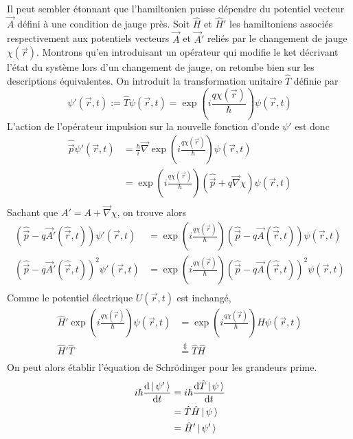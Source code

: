         Il peut sembler étonnant que l’hamiltonien puisse dépendre du potentiel vecteur $\vec{A}$ défini à une condition de jauge près. Soit $\hat{H}$ et $\hat{H}'$ les hamiltoniens associés respectivement aux potentiels vecteurs $\vec{A}$ et $\vec{A}'$ reliés par le changement de jauge $\chi(\vec{r})$. Montrons qu’en introduisant un opérateur qui modifie le ket décrivant l’état du système lors d’un changement de jauge, on retombe bien sur les descriptions équivalentes. On introduit la transformation unitaire $\hat{T}$ définie par 
        \[ \psi'(\vec{r},t) := \hat{T} \psi(\vec{r},t) = \exp\left(i \frac{q \chi(\vec{r})}{\hbar}\right) \psi(\vec{r},t) \]   
        L’action de l’opérateur impulsion sur la nouvelle fonction d’onde $\psi'$ est donc 
        \begin{align*}
            \hat{\vec{p}} \psi'(\vec{r},t) 
            &= \frac{\hbar}{i} \vec{\nabla} \exp\left(i \frac{q \chi(\vec{r})}{\hbar}\right) \psi(\vec{r},t) \\
            &= \exp\left(i \frac{q \chi(\vec{r})}{\hbar}\right) \left(\hat{\vec{p}} + q \vec{\nabla} \chi\right) \psi(\vec{r},t) \\
        \end{align*}
        Sachant que $A' = A + \vec{\nabla} \chi$, on trouve alors
        \begin{align*}
            \left(\hat{\vec{p}} - q \vec{A}'(\hat{\vec{r}},t)\right) \psi'(\vec{r},t) 
            &= \exp\left(i \frac{q \chi(\vec{r})}{\hbar}\right) \left(\hat{\vec{p}} - q \vec{A}(\hat{\vec{r}},t)\right) \psi(\vec{r},t) \\
            \left(\hat{\vec{p}} - q \vec{A}'(\hat{\vec{r}},t)\right)^2 \psi'(\vec{r},t) 
            &= \exp\left(i \frac{q \chi(\vec{r})}{\hbar}\right) \left(\hat{\vec{p}} - q \vec{A}(\hat{\vec{r}},t)\right)^2 \psi(\vec{r},t) \\
        \end{align*}
        Comme le potentiel électrique $U(\vec{r},t)$ est inchangé, 
        \begin{align*}
            \hat{H}' \exp\left(i \frac{q \chi(\vec{r})}{\hbar}\right) \psi(\vec{r},t) &= \exp\left(i \frac{q \chi(\vec{r})}{\hbar}\right) \hat{H} \psi(\vec{r},t) \\
            \hat{H}' \hat{T} &\overset{\Updownarrow}{=} \hat{T} \hat{H} \\
        \end{align*}
        On peut alors établir l’équation de Schrödinger pour les grandeurs prime.
        \begin{align*}
            i\hbar \frac{\text{d}\left| \, \psi' \, \right>}{\text{d}t} 
            &=  i\hbar \frac{\text{d}\hat{T}\left| \, \psi \, \right>}{\text{d}t} \\
            &= \hat{T} \hat{H} \left| \, \psi \, \right> \\
            &= \hat{H}' \left| \, \psi' \, \right> 
        \end{align*}
